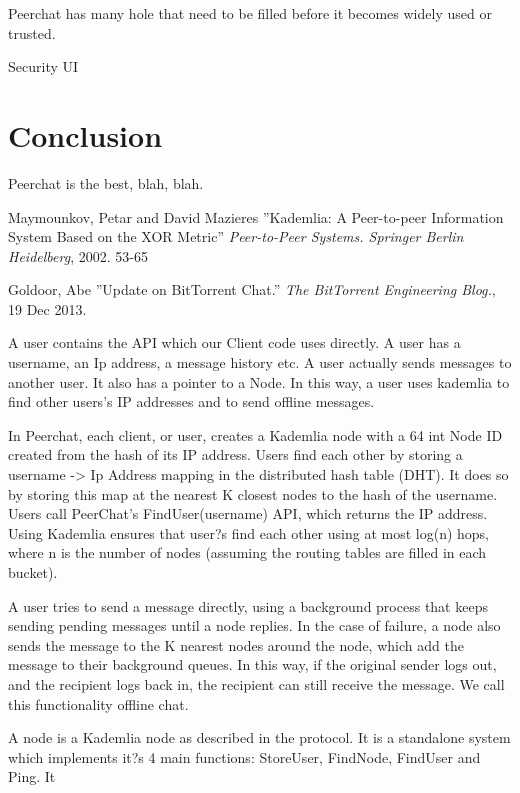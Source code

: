 \documentclass{article}
\begin{document}
Peerchat has many hole that need to be filled before it becomes widely used or trusted. 

Security
UI

\section{Conclusion}

Peerchat is the best, blah, blah.

\begin{thebibliography}{99}
   Maymounkov, Petar and David Mazieres
   ''Kademlia: A Peer-to-peer Information System Based on the XOR Metric''
   \textit{Peer-to-Peer Systems. Springer Berlin Heidelberg}, 2002. 53-65

	Goldoor, Abe
	''Update on BitTorrent Chat.''
	\textit{The BitTorrent Engineering Blog.}, 19 Dec 2013.

\end{thebibliography}

A user contains the API which our Client code uses directly. A user has a username, an Ip address, a message history etc. A user actually sends messages to another user. It also has a pointer to a Node. In this way, a user uses kademlia to find other users's IP addresses and to send offline messages.

In Peerchat, each client, or user, creates a Kademlia node with a 64 int Node ID created from the hash of its IP address. Users find each other by storing a username -> Ip Address mapping in the distributed hash table (DHT). It does so by storing this map at the nearest K closest nodes to the hash of the username. Users call PeerChat's FindUser(username) API, which returns the IP address. Using Kademlia ensures that user?s find each other using at most log(n) hops, where n is the number of nodes (assuming the routing tables are filled in each bucket). 

A user tries to send a message directly, using a background process that keeps sending pending messages until a node replies. In the case of failure, a node also sends the message to the K nearest nodes around the node, which add the message to their background queues. In this way, if the original sender logs out, and the recipient logs back in, the recipient can still receive the message. We call this functionality offline chat.

A node is a Kademlia node as described in the protocol. It is a standalone system which implements it?s 4 main functions: StoreUser, FindNode, FindUser and Ping. It 
\end{document}
